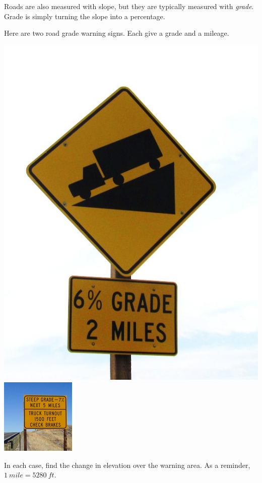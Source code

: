 \documentclass[noauthor,nooutcomes,hints,handout]{ximera}
\begin{document}
\begin{question}
Roads are also measured with slope, but they are typically measured with \emph{grade}. Grade is simply turning the slope into a percentage.

Here are two road grade warning signs. Each give a grade and a mileage. 

\includegraphics[width=.4\textwidth]{gradeWarning}
\includegraphics[width=.3\textwidth]{truckGradeWarning}

In each case, find the change in elevation over the warning area. As a reminder, $1\ mile=5280\ ft.$
\end{question}
\end{document}
